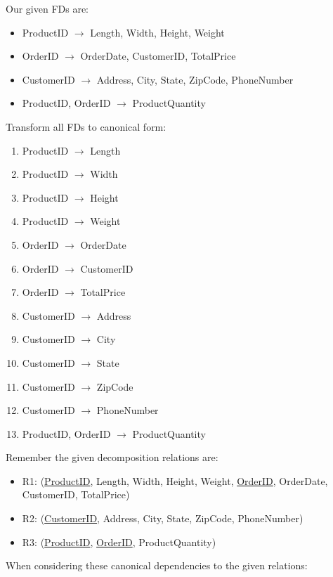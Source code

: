 \documentclass[a4paper]{article}
\begin{document}
Our given FDs are:

\begin{itemize}
    \item ProductID $\rightarrow$ Length, Width, Height, Weight
    \item OrderID $\rightarrow$ OrderDate, CustomerID, TotalPrice
    \item CustomerID $\rightarrow$ Address, City, State, ZipCode, PhoneNumber
    \item ProductID, OrderID $\rightarrow$ ProductQuantity
\end{itemize}

Transform all FDs to canonical form:

\begin{enumerate}
    \item ProductID $\rightarrow$ Length
    \item ProductID $\rightarrow$ Width
    \item ProductID $\rightarrow$ Height
    \item ProductID $\rightarrow$ Weight
    \item OrderID $\rightarrow$ OrderDate
    \item OrderID $\rightarrow$ CustomerID
    \item OrderID $\rightarrow$ TotalPrice
    \item CustomerID $\rightarrow$ Address
    \item CustomerID $\rightarrow$ City
    \item CustomerID $\rightarrow$ State
    \item CustomerID $\rightarrow$ ZipCode
    \item CustomerID $\rightarrow$ PhoneNumber
    \item ProductID, OrderID $\rightarrow$ ProductQuantity
\end{enumerate}

Remember the given decomposition relations are:

\begin{itemize}
    \item R1: (\underline{ProductID}, Length, Width, Height, Weight, \underline{OrderID}, OrderDate, CustomerID, TotalPrice)
    \item R2: (\underline{CustomerID}, Address, City, State, ZipCode, PhoneNumber)
    \item R3: (\underline{ProductID}, \underline{OrderID}, ProductQuantity)
\end{itemize}

When considering these canonical dependencies to the given relations:
\end{document}
